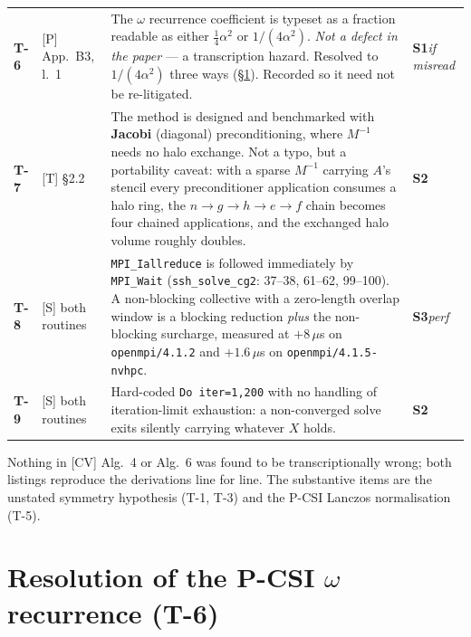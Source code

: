 \documentclass[11pt,a4paper]{article}
\newcommand{\Mi}{M^{-1}}
\newcommand{\sev}[1]{\textbf{#1}}
\newcommand{\src}[1]{\textsf{#1}}
\begin{document}
\begin{longtable}{@{}R{0.05\textwidth}R{0.13\textwidth}R{0.52\textwidth}R{0.07\textwidth}@{}}
\textbf{T-6} & \src{[P]} App.~B3, l.~1 &
The $\omega$ recurrence coefficient is typeset as a fraction readable as either
$\tfrac14\alpha^2$ or $1/(4\alpha^2)$. \emph{Not a defect in the paper} --- a transcription
hazard. Resolved to $1/(4\alpha^2)$ three ways (\S\ref{sec:omega}). Recorded so it need not be
re-litigated. & \sev{S1}\newline\emph{if misread}\\[2pt]

\textbf{T-7} & \src{[T]} \S2.2 &
The method is designed and benchmarked with \textbf{Jacobi} (diagonal) preconditioning, where
$\Mi$ needs no halo exchange. Not a typo, but a portability caveat: with a sparse $\Mi$
carrying $A$'s stencil every preconditioner application consumes a halo ring, the
$n\to g\to h\to e\to f$ chain becomes four chained applications, and the exchanged halo volume
roughly doubles. & \sev{S2}\\[2pt]

\textbf{T-8} & \src{[S]} both routines &
\texttt{MPI\_Iallreduce} is followed immediately by \texttt{MPI\_Wait}
(\texttt{ssh\_solve\_cg2}: 37--38, 61--62, 99--100). A non-blocking collective with a
zero-length overlap window is a blocking reduction \emph{plus} the non-blocking surcharge,
measured at $+8\,\mu$s on \texttt{openmpi/4.1.2} and $+1.6\,\mu$s on
\texttt{openmpi/4.1.5-nvhpc}. & \sev{S3}\newline\emph{perf}\\[2pt]

\textbf{T-9} & \src{[S]} both routines &
Hard-coded \texttt{Do iter=1,200} with no handling of iteration-limit exhaustion: a
non-converged solve exits silently carrying whatever $X$ holds. & \sev{S2}\\
\end{longtable}
\endgroup

Nothing in \src{[CV]} Alg.~4 or Alg.~6 was found to be transcriptionally wrong; both listings
reproduce the derivations line for line. The substantive items are the unstated symmetry
hypothesis (T-1, T-3) and the P-CSI Lanczos normalisation (T-5).

\section{Resolution of the P-CSI \texorpdfstring{$\omega$}{omega} recurrence (T-6)}
\label{sec:omega}
\end{document}
